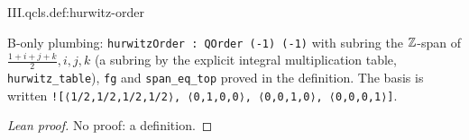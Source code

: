 \begin{definition}
\bonly
{}
\end{definition}
\begin{tfformal}{III.qcls.def:hurwitz-order}
\begin{tffidelity}
B-only plumbing: \texttt{hurwitzOrder : QOrder (-1) (-1)} with subring the $\mathbb{Z}$-span of $\tfrac{1+i+j+k}2,i,j,k$ (a subring by the explicit integral multiplication table, \texttt{hurwitz\_table}), \texttt{fg} and \texttt{span\_eq\_top} proved in the definition. The basis is written \texttt{![⟨1/2,1/2,1/2,1/2⟩, ⟨0,1,0,0⟩, ⟨0,0,1,0⟩, ⟨0,0,0,1⟩]}.
\end{tffidelity}
\end{tfformal}
\begin{proof}[Lean proof]
No proof: a definition.
\end{proof}

